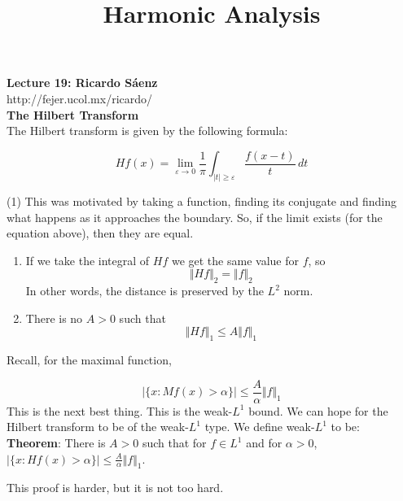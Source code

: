 \documentclass[12pt]{article}
\title{Harmonic Analysis}
\begin{document}
\noindent \textbf{Lecture 19: Ricardo S\'aenz} \\
\noindent http://fejer.ucol.mx/ricardo/ \\

\noindent \textbf{The Hilbert Transform} \\
\noindent The Hilbert transform is given by the following formula:

$$Hf(x) = \lim_{\varepsilon \rightarrow 0} \frac{1}{\pi} \int_{\vert t \vert \geq \varepsilon} \frac{f(x-t)}{t} \,dt$$

(1)
This was motivated by taking a function, finding its conjugate and finding what happens as it approaches the boundary. So, if the limit exists (for the equation above), then they are equal. 

\begin{enumerate}
\item If we take the integral of $Hf$ we get the same value for $f$, so
$$ \Vert Hf\Vert_2 = \Vert f \Vert_2$$
In other words, the distance is preserved by the $L^2$ norm. 
\item There is no $A>0$ such that 
$$\Vert Hf\Vert_1 \leq A \Vert f \Vert_1$$
\end{enumerate}

Recall, for the maximal function, 

$$\vert \{ x : Mf(x) > \alpha \} \vert \leq \frac{A}{\alpha} \Vert f \Vert_1$$
This is the next best thing. This is the weak-$L^1$ bound. We can hope for the Hilbert transform to be of the weak-$L^1$ type. We define weak-$L^1$ to be:  \\

\noindent \textbf{Theorem}: There is $A > 0$ such that for $f \in L^1$ and for $\alpha>0$, $\vert \{ x : Hf(x) > \alpha\} \vert \leq \frac{A}{\alpha}\Vert f \Vert_1$.

This proof is harder, but it is not too hard. \\
\end{document}
